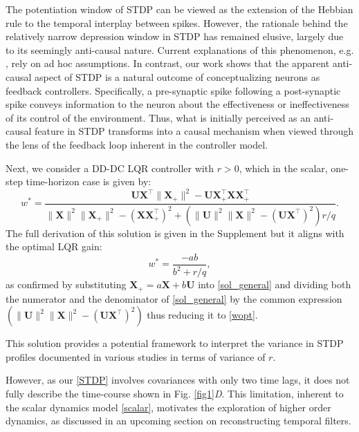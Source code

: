 \documentclass[9pt,twocolumn,twoside]{pnas-new}
\begin{document}
The potentiation window of STDP can be viewed as the extension of the Hebbian rule \citep{hebb1949} to the temporal interplay between spikes. However, the rationale behind the relatively narrow depression window in STDP has remained elusive, largely due to its seemingly anti-causal nature. Current explanations of this phenomenon, e.g. \citep{gilson2011stability, aceituno2023learning}, rely on ad hoc assumptions. In contrast, our work shows that the apparent anti-causal aspect of STDP is a natural outcome of conceptualizing neurons as feedback controllers. Specifically, a pre-synaptic spike following a post-synaptic spike conveys information to the neuron about the effectiveness or ineffectiveness of its control of the environment. Thus, what is initially perceived as an anti-causal feature in STDP transforms into a causal mechanism when viewed through the lens of the feedback loop inherent in the controller model.

Next, we consider a DD-DC LQR controller with $r>0$, which in the scalar, one-step time-horizon  case is given by:
\begin{equation}
    w^*=\frac{ \mathbf{U} \mathbf{X}^\top \|\mathbf{X}_+\|^2 - \mathbf{U} \mathbf{X}_+^\top \mathbf{X} \mathbf{X}_+^\top}
{\|\mathbf{X}\|^2\|\mathbf{X}_+\|^2-(\mathbf{X} \mathbf{X}_+^\top)^2+ \left(\|\mathbf{U}\|^2\|\mathbf{X}\|^2- (\mathbf{U} \mathbf{X}^\top)^2\right)r/q}.
\label{sol_general}
\end{equation}
The full derivation of this solution is given in the Supplement but it aligns with the optimal LQR gain:
\begin{equation}
    w^*=\frac{-ab}{b^2+r/q}, 
\label{wopt}
\end{equation}
as confirmed by substituting $\mathbf{X}_+= a \mathbf{X} + b\mathbf{U}$ into \eqref{sol_general} and dividing both the numerator and the denominator of \eqref{sol_general} by the common expression $\left(\|\mathbf{U}\|^2\|\mathbf{X}\|^2- (\mathbf{U} \mathbf{X}^\top)^2\right)$ thus reducing it to \eqref{wopt}.

This solution provides a potential framework to interpret the variance in STDP profiles documented in various studies \citep{caporale2008spike} in terms of variance of $r$.

However, as our \eqref{STDP} involves covariances with only two time lags, it does not fully describe the time-course shown in Fig. \ref{fig1}{\it D}. This limitation, inherent to the scalar dynamics model \eqref{scalar}, motivates the exploration of higher order dynamics, as discussed in an upcoming section on reconstructing temporal filters.
\end{document}

